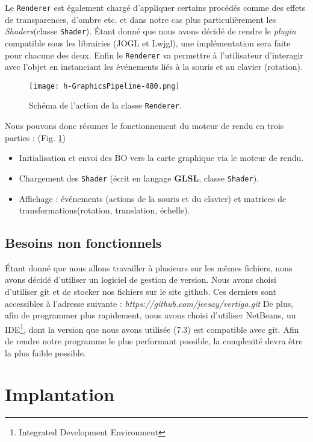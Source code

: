 \documentclass[11pt]{report}
\begin{document}
Le \texttt{Renderer} est également chargé d'appliquer certains procédés comme des effets de transparences, d'ombre etc. et dans notre cas plus particulièrement les \textit{Shaders}(classe \texttt{Shader}).
Étant donné que nous avons décidé de rendre le \textit{plugin} compatible sous les librairies (JOGL et Lwjgl), une implémentation sera faite pour chacune des deux.
Enfin le \texttt{Renderer} va permettre à l'utilisateur d'interagir avec l'objet en instanciant les événements liés à la souris et au clavier (rotation).

\begin{figure}[h!]
  \caption{Schéma de l'action de la classe \texttt{Renderer}.}
  \hspace{-1cm}
  \centering
\texttt{[image: h-GraphicsPipeline-480.png]} 
 \centering
\label{verticesFragments}
\end{figure}

Nous pouvons donc résumer le fonctionnement du moteur de rendu en trois parties : (Fig. \ref{verticesFragments}) %
\begin{itemize}
\item Initialisation et envoi des BO vers la carte graphique via le moteur de rendu.
\item Chargement des \texttt{Shader} (écrit en langage \textbf{GLSL}, classe \texttt{Shader}).
\item Affichage : événements (actions de la souris et du clavier) et matrices de transformations(rotation, translation, échelle).
\end{itemize}

\section{Besoins non fonctionnels}
Étant donné que nous allons travailler à plusieurs sur les mêmes fichiers, nous avons décidé d'utiliser un logiciel de gestion de version. Nous avons choisi d'utiliser git\cite{git} et de stocker nos fichiers sur le site github\cite{github}. Ces derniers sont accessibles à l'adresse suivante : \textit{https://github.com/jeesay/vertigo.git} 
De plus, afin de programmer plus rapidement, nous avons choisi d'utiliser NetBeans\cite{netbeans}, un IDE\footnote{Integrated Development Environment}, dont la version que nous avons utilisée (7.3) est compatible avec git.
Afin de rendre notre programme le plus performant possible, la complexité devra être la plus faible possible. 
\chapter{Implantation} %
\end{document}

